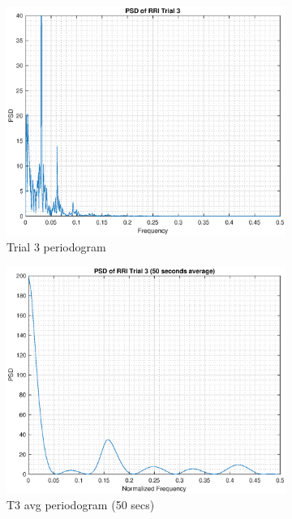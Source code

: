 \documentclass{article}
\begin{document}
\begin{figure}[h!]
\begin{subfigure}{0.32\textwidth}
\includegraphics[width = \textwidth]{rr_t3}
\caption{Trial 3 periodogram}
\label{fig:rr_t3}
\end{subfigure}
\begin{subfigure}{0.32\textwidth}
\centering
\includegraphics[width = \textwidth]{rr_t3_50}
\caption{T3 avg periodogram (50 secs)}
\label{fig:rr_t3_50}
\end{subfigure}
\begin{subfigure}{0.32\textwidth}
\centering

\end{subfigure}
\end{figure}
\end{document}
